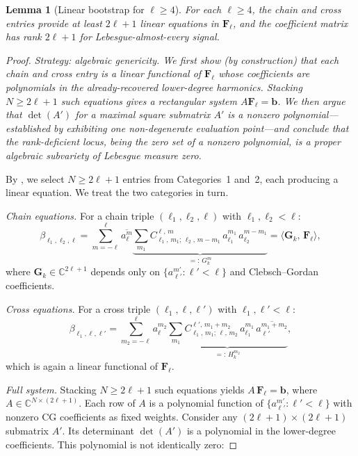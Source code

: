 \documentclass{article}
\theoremstyle{plain}
\newtheorem{lemma}[theorem]{Lemma}
\theoremstyle{definition}
\theoremstyle{remark}
\newcommand{\CG}[6]{C^{#5,\,#6}_{#1,\,#2;\,#3,\,#4}}
\newcommand{\C}{\mathbb{C}}
\newcommand{\conj}[1]{\overline{#1}}
\newcommand{\ip}[2]{\langle #1,\, #2 \rangle}
\begin{document}
\begin{lemma}[Linear bootstrap for $\ell \ge 4$]
\label{lem:linear-bootstrap}
For each $\ell \ge 4$, the chain and cross entries provide at least
$2\ell + 1$ linear equations in $\mathbf{F}_\ell$, and the coefficient
matrix has rank $2\ell+1$ for Lebesgue-almost-every signal.
\end{lemma}
\begin{proof}
\emph{Strategy: algebraic genericity.
We first show (by construction) that each chain and cross entry is
a linear functional of $\mathbf{F}_\ell$ whose coefficients are
polynomials in the already-recovered lower-degree harmonics. Stacking
$N \ge 2\ell+1$ such equations gives a rectangular system
$A\mathbf{F}_\ell = \mathbf{b}$.
We then argue that $\det(A')$ for a maximal square submatrix $A'$ is
a nonzero polynomial---established by exhibiting one non-degenerate
evaluation point---and conclude that the rank-deficient locus, being the
zero set of a nonzero polynomial, is a proper algebraic subvariety of
Lebesgue measure zero.}

By , we select $N \ge 2\ell+1$ entries from
Categories~1 and~2, each producing a linear equation. We treat the two
categories in turn.

\medskip\noindent
\textit{Chain equations.}
For a chain triple $(\ell_1, \ell_2, \ell)$ with $\ell_1, \ell_2 < \ell$:
\[
  \beta_{\ell_1,\ell_2,\ell}
  = \sum_{m=-\ell}^{\ell} \conj{a_\ell^m}
    \underbrace{
      \sum_{m_1} \CG{\ell_1}{m_1}{\ell_2}{m-m_1}{\ell}{m}\,
      a_{\ell_1}^{m_1}\,a_{\ell_2}^{m-m_1}
    }_{=:\, G_k^m}
  = \ip{\mathbf{G}_k}{\mathbf{F}_\ell},
\]
where $\mathbf{G}_k \in \C^{2\ell+1}$ depends only on
$\{a_{\ell'}^{m'} : \ell' < \ell\}$ and Clebsch--Gordan coefficients.

\medskip\noindent
\textit{Cross equations.}
For a cross triple $(\ell_1, \ell, \ell')$ with $\ell_1, \ell' < \ell$:
\[
  \beta_{\ell_1,\ell,\ell'}
  = \sum_{m_2=-\ell}^{\ell} a_\ell^{m_2}
    \underbrace{
      \sum_{m_1} \CG{\ell_1}{m_1}{\ell}{m_2}{\ell'}{m_1+m_2}\,
      a_{\ell_1}^{m_1}\,\conj{a_{\ell'}^{m_1+m_2}}
    }_{=:\, H_k^{m_2}},
\]
which is again a linear functional of $\mathbf{F}_\ell$.

\medskip\noindent
\textit{Full system.}
Stacking $N \ge 2\ell+1$ such equations yields
$A\,\mathbf{F}_\ell = \mathbf{b}$,
where $A \in \C^{N \times (2\ell+1)}$. Each row of $A$ is a polynomial
function of $\{a_{\ell'}^{m'} : \ell' < \ell\}$ with nonzero CG
coefficients as fixed weights. Consider any $(2\ell+1) \times (2\ell+1)$
submatrix $A'$. Its determinant $\det(A')$ is a polynomial in the
lower-degree coefficients. This polynomial is not identically zero:


\end{proof}
\end{document}
